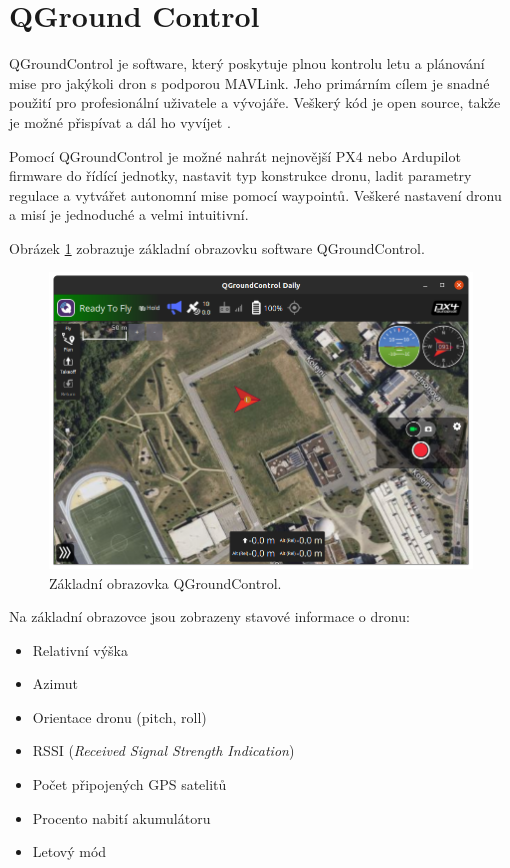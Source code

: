 \section{QGround Control}

QGroundControl je software, který poskytuje plnou kontrolu letu a plánování mise pro jakýkoli dron s podporou MAVLink. Jeho primárním cílem je snadné použití pro profesionální uživatele a vývojáře. Veškerý kód je open source, takže je možné přispívat a dál ho vyvíjet \cite{QGround}.

Pomocí QGroundControl je možné nahrát nejnovější PX4 nebo Ardupilot firmware do řídící jednotky, nastavit typ konstrukce dronu, ladit parametry regulace a vytvářet autonomní mise pomocí waypointů. Veškeré nastavení dronu a misí je jednoduché a velmi intuitivní.

Obrázek \ref{fig:QGC} zobrazuje základní obrazovku software QGroundControl.

\begin{figure}[!ht]
    \begin{center}
        \includegraphics[scale=0.47]{obrazky/QG1}
    \end{center}
    \caption[Základní obrazovka QGroundControl]{Základní obrazovka QGroundControl.}
    \label{fig:QGC}
\end{figure}

Na základní obrazovce jsou zobrazeny stavové informace o dronu:

\begin{itemize}
    \item Relativní výška
    \item Azimut
    \item Orientace dronu (pitch, roll)
    \item RSSI (\textit{Received Signal Strength Indication})
    \item Počet připojených GPS satelitů
    \item Procento nabití akumulátoru
    \item Letový mód
\end{itemize}

